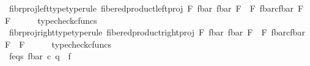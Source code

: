 \begin{isabellebody}
\ fibr{\isacharunderscore}{\kern0pt}proj{\isacharunderscore}{\kern0pt}left{\isacharunderscore}{\kern0pt}type{\isacharbrackleft}{\kern0pt}type{\isacharunderscore}{\kern0pt}rule{\isacharbrackright}{\kern0pt}{\isacharcolon}{\kern0pt}\ {\isachardoublequoteopen}fibered{\isacharunderscore}{\kern0pt}product{\isacharunderscore}{\kern0pt}left{\isacharunderscore}{\kern0pt}proj\ F\ {\isacharparenleft}{\kern0pt}f{\isacharunderscore}{\kern0pt}bar{\isacharparenright}{\kern0pt}\ {\isacharparenleft}{\kern0pt}f{\isacharunderscore}{\kern0pt}bar{\isacharparenright}{\kern0pt}\ F\ {\isacharcolon}{\kern0pt}\ F\ \isactrlbsub {\isacharparenleft}{\kern0pt}f{\isacharunderscore}{\kern0pt}bar{\isacharparenright}{\kern0pt}\isactrlesub {\isasymtimes}\isactrlsub c\isactrlbsub {\isacharparenleft}{\kern0pt}f{\isacharunderscore}{\kern0pt}bar{\isacharparenright}{\kern0pt}\isactrlesub \ F\ {\isasymrightarrow}\ F{\isachardoublequoteclose}\isanewline
\ \ \ \ \isamarkupfalse%
\ typecheck{\isacharunderscore}{\kern0pt}cfuncs\isanewline
\ \ \isamarkupfalse%
\ fibr{\isacharunderscore}{\kern0pt}proj{\isacharunderscore}{\kern0pt}right{\isacharunderscore}{\kern0pt}type{\isacharbrackleft}{\kern0pt}type{\isacharunderscore}{\kern0pt}rule{\isacharbrackright}{\kern0pt}{\isacharcolon}{\kern0pt}\ {\isachardoublequoteopen}fibered{\isacharunderscore}{\kern0pt}product{\isacharunderscore}{\kern0pt}right{\isacharunderscore}{\kern0pt}proj\ F\ {\isacharparenleft}{\kern0pt}f{\isacharunderscore}{\kern0pt}bar{\isacharparenright}{\kern0pt}\ {\isacharparenleft}{\kern0pt}f{\isacharunderscore}{\kern0pt}bar{\isacharparenright}{\kern0pt}\ F\ {\isacharcolon}{\kern0pt}\ F\ \isactrlbsub {\isacharparenleft}{\kern0pt}f{\isacharunderscore}{\kern0pt}bar{\isacharparenright}{\kern0pt}\isactrlesub {\isasymtimes}\isactrlsub c\isactrlbsub {\isacharparenleft}{\kern0pt}f{\isacharunderscore}{\kern0pt}bar{\isacharparenright}{\kern0pt}\isactrlesub \ F\ {\isasymrightarrow}\ F{\isachardoublequoteclose}\isanewline
\ \ \ \ \isamarkupfalse%
\ typecheck{\isacharunderscore}{\kern0pt}cfuncs\isanewline
\ \ \isanewline
\ \ \isanewline
\ \ \ \ \isanewline
\ \ \ \ \isanewline
\ \ \ \ \isanewline
\ \ \ \ \isanewline
\ \ \ \ \isanewline
\ \ \ \ \isanewline
\ \ \ \ \isanewline
\ \ \isanewline
\ \ \isamarkupfalse%
\ f{\isacharunderscore}{\kern0pt}eqs{\isacharcolon}{\kern0pt}\ {\isachardoublequoteopen}f{\isacharunderscore}{\kern0pt}bar\ {\isasymcirc}\isactrlsub c\ q\ {\isacharequal}{\kern0pt}\ f{\isachardoublequoteclose}\isanewline
\ \ \ \ \isamarkupfalse%
\ {\isacharminus}{\kern0pt}\ \isanewline

\end{isabellebody}
